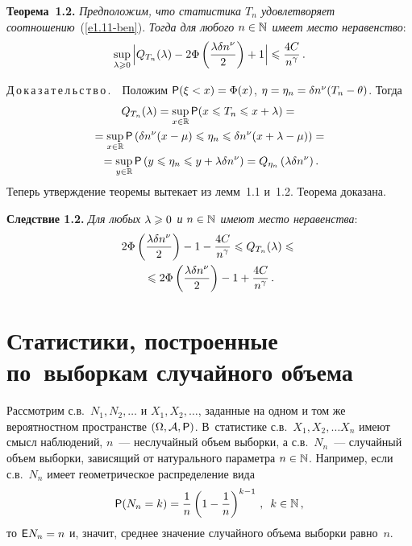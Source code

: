 \begin{multicols}{2}
\smallskip

\noindent
\textbf{Теорема~1.2.} \textit{Предположим, что статистика $T_n$
удовлетворяет соотношению}~(\ref{e1.11-ben}). \textit{Тогда для любого $n\hm\in\N$ имеет
место неравенство}:
$$
\sup\limits_{\lambda\geqslant0}\Big|Q_{T_n}(\lambda)-
2\Phi\left(\displaystyle\frac{\displaystyle \lambda\delta n^{\nu}\mathstrut}{\displaystyle 2\mathstrut}\right)+1\Big|\leqslant
\displaystyle\frac{\displaystyle 4C\mathstrut}{\displaystyle n^{\gamma}\mathstrut}\,.
$$

\smallskip

\noindent
Д\,о\,к\,а\,з\,а\,т\,е\,л\,ь\,с\,т\,в\,о\,.\ \  Положим ${\sf P}(\xi<x)\hm=\Phi(x)$, $\eta\hm=
\eta_n\hm=\delta n^{\nu}(T_n-\theta)$. Тогда
\begin{multline*}
Q_{T_n}(\lambda)=\sup\limits_{x\in\mathbb{R}}{\sf P}(x\leqslant T_n\leqslant x+\lambda)={}\\
{}=
\sup\limits_{x\in\mathbb{R}}{\sf P}\left(\delta n^{\nu}(x-\mu)\leqslant \eta_n\leqslant \delta
n^{\nu}(x+\lambda-\mu)\right)={}
\\
{}=\sup\limits_{y\in\mathbb{R}}{\sf P}\left(y\leqslant  \eta_n\leqslant y+\lambda\delta
n^{\nu}\right)=Q_{\eta_n}\left(\lambda\delta n^{\nu}\right).
\end{multline*}
Теперь утверждение теоремы вытекает из лемм~1.1 и~1.2. Теорема
доказана.

\smallskip

\noindent
\textbf{Следствие 1.2.} \textit{Для любых $\lambda\hm\geqslant0$ и $n\hm\in\N$ имеют
место неравенства}:
\begin{multline*}
2\Phi\left(\displaystyle\frac{\displaystyle \lambda\delta n^{\nu}\mathstrut}{\displaystyle 2\mathstrut}\right)-1-
\displaystyle\frac{\displaystyle 4C\mathstrut}{\displaystyle n^{\gamma}\mathstrut}\leqslant  Q_{T_n}(\lambda)\leqslant{}\\
{}\leqslant
2\Phi\left(\displaystyle\frac{\displaystyle \lambda\delta n^{\nu}\mathstrut}{\displaystyle 2\mathstrut}\right)-1+
\displaystyle\frac{\displaystyle 4C\mathstrut}{\displaystyle n^{\gamma}\mathstrut}\,.
\end{multline*}

\smallskip

\section{Статистики, построенные по~выборкам случайного объема}

Рассмотрим с.в.\  $N_1, N_2, \ldots$ и  $X_1, X_2, \ldots$, заданные
на одном и том же вероятностном пространстве $(\Omega, {\cal A},
{\sf P})$. В~статистике с.в.\ $X_1, X_2, \ldots X_n$ имеют смысл
наблюдений, $n$~--- неслучайный объем выборки, а с.в.\ $N_n$~---
случайный объем выборки, зависящий от натурального параметра $n\hm\in\N$. 
Например, если с.в.~$N_n$ имеет гео\-мет\-ри\-че\-ское распределение вида
$$
{\sf P}(N_n=k)=\displaystyle\frac{\displaystyle 1\mathstrut}{\displaystyle n\mathstrut}\left(1-\displaystyle\frac{\displaystyle 1\mathstrut}{\displaystyle n\mathstrut}\right)^{k-1}\,,\enskip
k\in\mathbb N\,,
$$
то ${\sf E}N_n\hm=n$ и, значит, среднее значение случайного объема
выборки равно~$n$.


\end{multicols}
